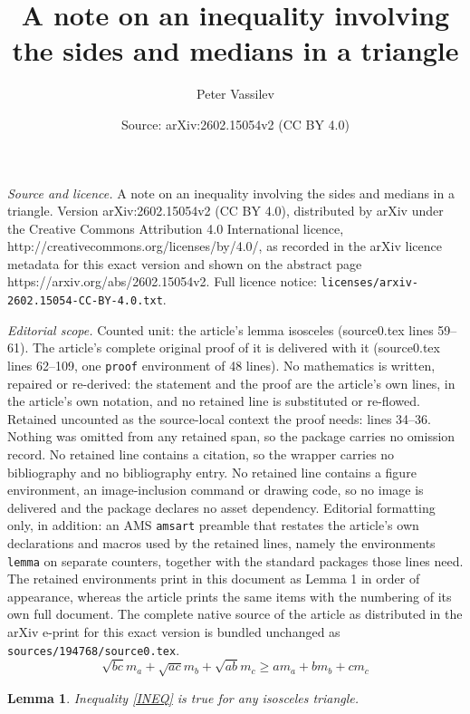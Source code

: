 \documentclass[10pt,a4paper]{amsart}
\title{A note on an inequality involving the sides and medians in a triangle}
\author{Peter Vassilev}
\date{Source: arXiv:2602.15054v2 (CC BY 4.0)}
\newtheorem{lemma}{Lemma}
\begin{document}
\maketitle

\noindent\emph{Source and licence.} A note on an inequality involving the sides and medians in a triangle. Version arXiv:2602.15054v2 (CC BY 4.0), distributed by arXiv under the Creative Commons Attribution 4.0 International licence, http://creativecommons.org/licenses/by/4.0/, as recorded in the arXiv licence metadata for this exact version and shown on the abstract page https://arxiv.org/abs/2602.15054v2. Full licence notice: \texttt{licenses/arxiv-2602.15054-CC-BY-4.0.txt}.\par\smallskip

\noindent\textit{Editorial scope.} Counted unit: the article's lemma isosceles (source0.tex lines 59--61). The article's complete original proof of it is delivered with it (source0.tex lines 62--109, one \texttt{proof} environment of 48 lines). No mathematics is written, repaired or re-derived: the statement and the proof are the article's own lines, in the article's own notation, and no retained line is substituted or re-flowed.  Retained uncounted as the source-local context the proof needs: lines 34--36.  Nothing was omitted from any retained span, so the package carries no omission record.  No retained line contains a citation, so the wrapper carries no bibliography and no bibliography entry.  No retained line contains a figure environment, an image-inclusion command or drawing code, so no image is delivered and the package declares no asset dependency.  Editorial formatting only, in addition: an AMS \texttt{amsart} preamble that restates the article's own declarations and macros used by the retained lines, namely the environments \texttt{lemma} on separate counters, together with the standard packages those lines need.  The retained environments print in this document as Lemma 1 in order of appearance, whereas the article prints the same items with the numbering of its own full document.  The complete native source of the article as distributed in the arXiv e-print for this exact version is bundled unchanged as \texttt{sources/194768/source0.tex}.
\begin{equation}\label{INEQ}
 \sqrt{bc} m_a+ \sqrt{ac} m_b+\sqrt{ab} m_c \geq a m_a+ b m_b+c m_c 
\end{equation}

\begin{lemma}\label{isosceles} 
Inequality \eqref{INEQ} is true for any isosceles triangle.
\end{lemma}
\end{document}
